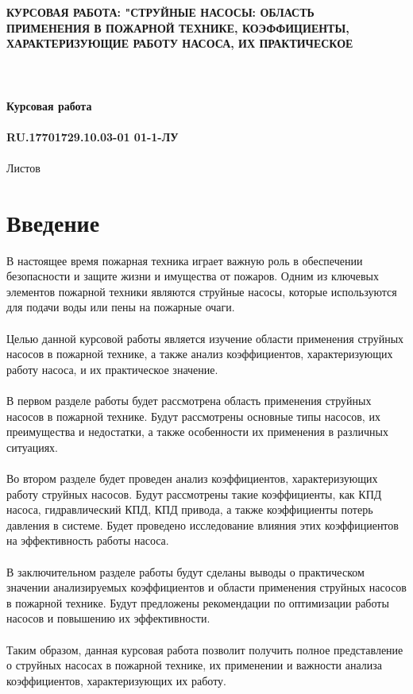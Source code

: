 \documentclass{article}
\begin{document}
\fontsize{14}{16}\selectfont
\thispagestyle{empty}
\clearpage
{}
\bigskip
\begin{center}
\topskip=0pt
\vspace*{\fill}
\textbf{КУРСОВАЯ РАБОТА: "СТРУЙНЫЕ НАСОСЫ: ОБЛАСТЬ\\
ПРИМЕНЕНИЯ В ПОЖАРНОЙ ТЕХНИКЕ, КОЭФФИЦИЕНТЫ,\\
ХАРАКТЕРИЗУЮЩИЕ РАБОТУ НАСОСА, ИХ ПРАКТИЧЕСКОЕ\\
~\\
~\\
~\\
Курсовая работа\\
~\\
RU.17701729.10.03-01 01-1-ЛУ}\\
~\\
Листов \ztotpages\\
\vspace*{\fill}
\end{center}
\begin{center}
\end{center}
\newpage
\tableofcontents
\newpage
\newpage
\section{Введение}
В настоящее время пожарная техника играет важную роль в обеспечении безопасности и защите жизни и имущества от пожаров. Одним из ключевых элементов пожарной техники являются струйные насосы, которые используются для подачи воды или пены на пожарные очаги.\\
~\\
Целью данной курсовой работы является изучение области применения струйных насосов в пожарной технике, а также анализ коэффициентов, характеризующих работу насоса, и их практическое значение.\\
~\\
В первом разделе работы будет рассмотрена область применения струйных насосов в пожарной технике. Будут рассмотрены основные типы насосов, их преимущества и недостатки, а также особенности их применения в различных ситуациях.\\
~\\
Во втором разделе будет проведен анализ коэффициентов, характеризующих работу струйных насосов. Будут рассмотрены такие коэффициенты, как КПД насоса, гидравлический КПД, КПД привода, а также коэффициенты потерь давления в системе. Будет проведено исследование влияния этих коэффициентов на эффективность работы насоса.\\
~\\
В заключительном разделе работы будут сделаны выводы о практическом значении анализируемых коэффициентов и области применения струйных насосов в пожарной технике. Будут предложены рекомендации по оптимизации работы насосов и повышению их эффективности.\\
~\\
Таким образом, данная курсовая работа позволит получить полное представление о струйных насосах в пожарной технике, их применении и важности анализа коэффициентов, характеризующих их работу.
\end{document}
